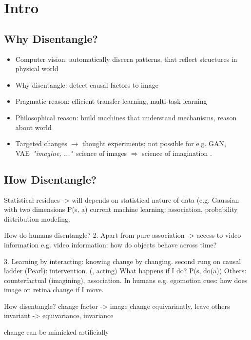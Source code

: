 \chapter{Intro}

\section{Why Disentangle?}
	\begin{itemize}
		\item Computer vision: automatically discern patterns, that reflect structures in physical world
		\item Why disentangle: detect causal factors to image
		\item Pragmatic reason: efficient transfer learning, multi-task learning
		\item Philosophical reason: build machines that understand mechanisms, reason about world \cite{Pearl:2018im}
		\item Targeted changes $\rightarrow$ thought experiments; not possible for e.g. GAN, VAE\ \textit{"imagine, ..."}\ science of images $\Rightarrow$ science of imagination \cite{Mahadevan:2018tz}.
	\end{itemize}

\section{How Disentangle?}
	Statistical residues -> will depends on statistical nature of data (e.g. Gaussian with two dimensions P(s, a)
	current machine learning: association, probability distribution modeling.

	How do humans disentangle?
	2. Apart from pure association -> access to video information
	e.g. video information: how do objects behave across time?

	3. Learning by interacting: knowing change by changing.
	second rung on causal ladder (Pearl): intervention. (, acting) What happens if I do?
	P(s, do(a))
	Others: counterfactual (imagining), association.
	In humans e.g. egomotion cues: how does image on retina change if I move.


	How disentangle?
	change factor -> image change equivariantly, leave others invariant
	-> equivariance, invariance

	change can be mimicked artificially



